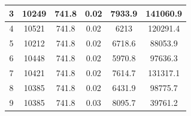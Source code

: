 \documentclass[
  digital, %
  oneside,
  notable, %
  nolof,     %
  nolot     %
]{fithesis3}
\begin{document}
\begin{table}[]
\begin{tabular}{|c|c|c|c|c|c|}
		3                & 10249                                                        & 741.8                                                                  & 0.02                                                                   & 7933.9                                                               & 141060.9                                                        \\ \hline
		4                & 10521                                                        & 741.8                                                                  & 0.02                                                                   & 6213                                                                 & 120291.4                                                        \\ \hline
		5                & 10212                                                        & 741.8                                                                  & 0.02                                                                   & 6718.6                                                               & 88053.9                                                         \\ \hline
		6                & 10448                                                        & 741.8                                                                  & 0.02                                                                   & 5970.8                                                               & 97636.3                                                         \\ \hline
		7                & 10421                                                        & 741.8                                                                  & 0.02                                                                   & 7614.7                                                               & 131317.1                                                        \\ \hline
		8                & 10385                                                        & 741.8                                                                  & 0.02                                                                   & 6431.9                                                               & 98775.7                                                         \\ \hline
		9                & 10385                                                        & 741.8                                                                  & 0.03                                                                   & 8095.7                                                               & 39761.2                                                         \\ \hline

\end{tabular}
\end{table}
\end{document}
